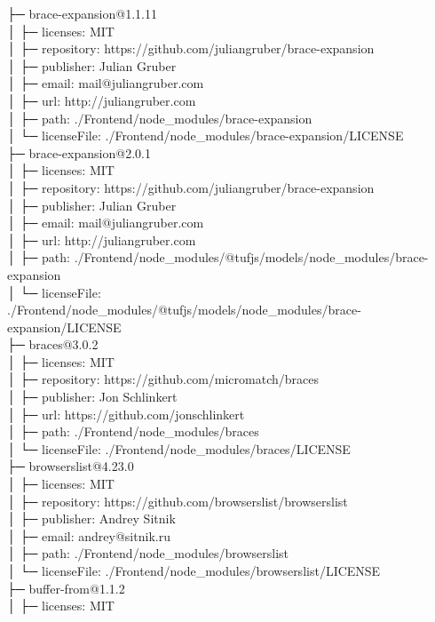 ├─ brace-expansion@1.1.11\\
│  ├─ licenses: MIT\\
│  ├─ repository: https://github.com/juliangruber/brace-expansion\\
│  ├─ publisher: Julian Gruber\\
│  ├─ email: mail@juliangruber.com\\
│  ├─ url: http://juliangruber.com\\
│  ├─ path: ./Frontend/node\_modules/brace-expansion\\
│  └─ licenseFile: ./Frontend/node\_modules/brace-expansion/LICENSE\\
├─ brace-expansion@2.0.1\\
│  ├─ licenses: MIT\\
│  ├─ repository: https://github.com/juliangruber/brace-expansion\\
│  ├─ publisher: Julian Gruber\\
│  ├─ email: mail@juliangruber.com\\
│  ├─ url: http://juliangruber.com\\
│  ├─ path: ./Frontend/node\_modules/@tufjs/models/node\_modules/brace-expansion\\
│  └─ licenseFile: ./Frontend/node\_modules/@tufjs/models/node\_modules/brace-expansion/LICENSE\\
├─ braces@3.0.2\\
│  ├─ licenses: MIT\\
│  ├─ repository: https://github.com/micromatch/braces\\
│  ├─ publisher: Jon Schlinkert\\
│  ├─ url: https://github.com/jonschlinkert\\
│  ├─ path: ./Frontend/node\_modules/braces\\
│  └─ licenseFile: ./Frontend/node\_modules/braces/LICENSE\\
├─ browserslist@4.23.0\\
│  ├─ licenses: MIT\\
│  ├─ repository: https://github.com/browserslist/browserslist\\
│  ├─ publisher: Andrey Sitnik\\
│  ├─ email: andrey@sitnik.ru\\
│  ├─ path: ./Frontend/node\_modules/browserslist\\
│  └─ licenseFile: ./Frontend/node\_modules/browserslist/LICENSE\\
├─ buffer-from@1.1.2\\
│  ├─ licenses: MIT\\
